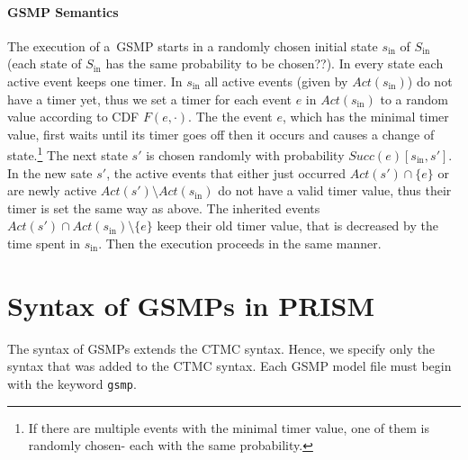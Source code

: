 \documentclass{article}
\renewcommand{\_}{\underline{~}}
\newcommand{\suc}{Succ}
\newcommand{\initstate}{s_\mathrm{in}}
\newcommand{\initstates}{S_\mathrm{in}}
\newcommand{\act}{Act}
\newcommand{\code}[1]{\texttt{#1}}
\begin{document}
\paragraph{GSMP Semantics}
The execution of a~GSMP starts in a randomly chosen initial state $\initstate$ of $\initstates$ (each state of $\initstates$ has the same probability to be chosen??). 
In every state each active event keeps one timer.
In $\initstate$ all active events (given by $\act(\initstate)$) do not have a timer yet, thus we set a timer for each event $e$ in $\act(\initstate)$ to a random value according to CDF $F(e,\cdot)$.
The the event $e$, which has the minimal timer value, first waits until its timer goes off then it occurs and causes a change of state.\footnote{If there are multiple events with the minimal timer value, one of them is randomly chosen- each with the same probability.}  
The next state $s'$ is chosen randomly with probability $\suc(e)[\initstate,s']$.
In the new sate $s'$, the active events that either just occurred $\act(s') \cap \{e\}$ or are newly active $\act(s') \setminus \act(\initstate)$ do not have a valid timer value, thus their timer is set the same way as above.
The inherited events $\act(s') \cap \act(\initstate) \setminus \{e\}$ keep their old timer value, that is decreased by the time spent in $\initstate$. 
Then the execution proceeds in the same manner. 

\section*{Syntax of GSMPs in PRISM}
The syntax of GSMPs extends the CTMC syntax.
Hence, we specify only the syntax that was added to the CTMC syntax. 
Each GSMP model file must begin with the keyword \code{gsmp}. 
\end{document}
